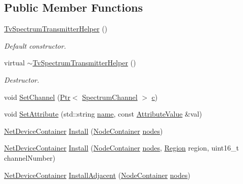 \subsection*{Public Member Functions}
\begin{DoxyCompactItemize}
\item 
\hyperlink{classns3_1_1TvSpectrumTransmitterHelper_a017080c0fc9fb9f154589e737fe18829}{Tv\+Spectrum\+Transmitter\+Helper} ()
\begin{DoxyCompactList}\small\item\em Default constructor. \end{DoxyCompactList}\item 
virtual \hyperlink{classns3_1_1TvSpectrumTransmitterHelper_ab066beb0e1637ec3a0ff09f2244ec6fe}{$\sim$\+Tv\+Spectrum\+Transmitter\+Helper} ()
\begin{DoxyCompactList}\small\item\em Destructor. \end{DoxyCompactList}\item 
void \hyperlink{classns3_1_1TvSpectrumTransmitterHelper_a14d44a79d659b99a2e80916eadefbd54}{Set\+Channel} (\hyperlink{classns3_1_1Ptr}{Ptr}$<$ \hyperlink{classns3_1_1SpectrumChannel}{Spectrum\+Channel} $>$ \hyperlink{mmwave_2model_2fading-traces_2fading__trace__generator_8m_ae0323a9039add2978bf5b49550572c7c}{c})
\item 
void \hyperlink{classns3_1_1TvSpectrumTransmitterHelper_af602e03cad3ae4cabafcb127c888fb53}{Set\+Attribute} (std\+::string \hyperlink{generate__test__data__lte__spectrum__model_8m_ab74e6bf80237ddc4109968cedc58c151}{name}, const \hyperlink{classns3_1_1AttributeValue}{Attribute\+Value} \&val)
\item 
\hyperlink{classns3_1_1NetDeviceContainer}{Net\+Device\+Container} \hyperlink{classns3_1_1TvSpectrumTransmitterHelper_af745c914e5162e1d07d88d889f92942a}{Install} (\hyperlink{classns3_1_1NodeContainer}{Node\+Container} \hyperlink{visualizer-ideas_8txt_a3e1b3808014a2c68ab0cd0182e041be2}{nodes})
\item 
\hyperlink{classns3_1_1NetDeviceContainer}{Net\+Device\+Container} \hyperlink{classns3_1_1TvSpectrumTransmitterHelper_a47c97a7364a67ec9de0394044e6db151}{Install} (\hyperlink{classns3_1_1NodeContainer}{Node\+Container} \hyperlink{visualizer-ideas_8txt_a3e1b3808014a2c68ab0cd0182e041be2}{nodes}, \hyperlink{classns3_1_1TvSpectrumTransmitterHelper_a7b4aafcd25156458e9ec922587169bbe}{Region} region, uint16\+\_\+t channel\+Number)
\item 
\hyperlink{classns3_1_1NetDeviceContainer}{Net\+Device\+Container} \hyperlink{classns3_1_1TvSpectrumTransmitterHelper_a671aa2a952822ecf3a74db1e7f643541}{Install\+Adjacent} (\hyperlink{classns3_1_1NodeContainer}{Node\+Container} \hyperlink{visualizer-ideas_8txt_a3e1b3808014a2c68ab0cd0182e041be2}{nodes})

\end{DoxyCompactItemize}
